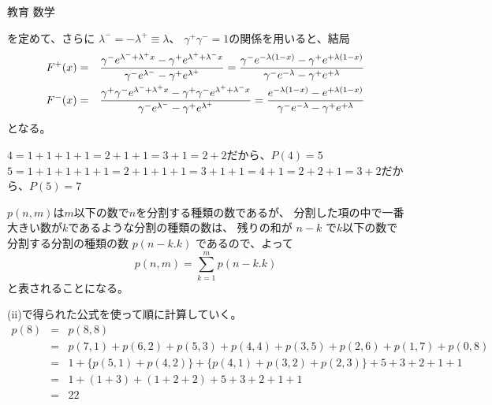 \documentclass[fleqn]{jbook}
\begin{document}
\begin{answer}{教育 数学}{}
\begin{subanswers}
\begin{subsubanswers}
    を定めて、さらに $\lambda^-=-\lambda^+\equiv \lambda$、
    $\gamma^+\gamma^-=1$の関係を用いると、結局
%
    \begin{eqnarray*}
      F^+(x) &=& \frac{%
                   \gamma^-e^{\lambda^-+\lambda^+x}%
                  -\gamma^+e^{\lambda^++\lambda^-x}%
                 }{
                   \gamma^-e^{\lambda^-}%
                  -\gamma^+e^{\lambda^+}%
                 } 
              =  \frac{%
                   \gamma^-e^{-\lambda(1-x)}%
                  -\gamma^+e^{+\lambda(1-x)}%
                 }{
                   \gamma^-e^{-\lambda}%
                  -\gamma^+e^{+\lambda}%
                 } \\
      F^-(x) &=& \frac{%
                   \gamma^+\gamma^-e^{\lambda^-+\lambda^+x}%
                  -\gamma^+\gamma^-e^{\lambda^++\lambda^-x}%
                 }{
                   \gamma^-e^{\lambda^-}%
                  -\gamma^+e^{\lambda^+}%
                 }
              =  \frac{%
                   e^{-\lambda(1-x)}%
                  -e^{+\lambda(1-x)}%
                 }{
                   \gamma^-e^{-\lambda}%
                  -\gamma^+e^{+\lambda}%
                 }
    \end{eqnarray*}
%
    となる。

  \end{subsubanswers}


\newpage
\SubAnswer
  \begin{subsubanswers}
  \SubSubAnswer
    $4=1+1+1+1=2+1+1=3+1=2+2$だから、$P(4)=5$ \\
    $5=1+1+1+1+1=2+1+1+1=3+1+1=4+1=2+2+1=3+2$だから、$P(5)=7$

  \SubSubAnswer
    $p(n,m)$は$m$以下の数で$n$を分割する種類の数であるが、
    分割した項の中で一番大きい数が$k$であるような分割の種類の数は、
    残りの和が $n-k$ で$k$以下の数で分割する分割の種類の数 $p(n-k.k)$
    であるので、よって
%
    \[ p(n,m) = \sum_{k=1}^{m} p(n-k.k) \]
%
    と表されることになる。


  \SubSubAnswer
    (ii)で得られた公式を使って順に計算していく。
%
    \begin{eqnarray*}
      p(8)&=&p(8,8) \\
          &=&p(7,1)+p(6,2)+p(5,3)+p(4,4)+p(3,5)+p(2,6)+p(1,7)+p(0,8)\\
          &=&1+\{p(5,1)+p(4,2)\}+\{p(4,1)+p(3,2)+p(2,3)\}+5+3+2+1+1\\
          &=&1+(1+3)+(1+2+2)+5+3+2+1+1\\
          &=&22
    \end{eqnarray*}


\end{subsubanswers}
\end{subanswers}
\end{answer}
\end{document}
